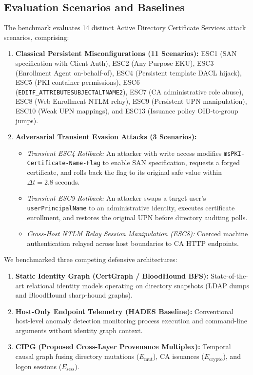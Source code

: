 \subsection{Evaluation Scenarios and Baselines}
The benchmark evaluates 14 distinct Active Directory Certificate Services attack scenarios, comprising:
\begin{enumerate}
    \item \textbf{Classical Persistent Misconfigurations (11 Scenarios):} ESC1 (SAN specification with Client Auth), ESC2 (Any Purpose EKU), ESC3 (Enrollment Agent on-behalf-of), ESC4 (Persistent template DACL hijack), ESC5 (PKI container permissions), ESC6 (\texttt{EDITF\_ATTRIBUTESUBJECTALTNAME2}), ESC7 (CA administrative role abuse), ESC8 (Web Enrollment NTLM relay), ESC9 (Persistent UPN manipulation), ESC10 (Weak UPN mappings), and ESC13 (Issuance policy OID-to-group jumps).
    \item \textbf{Adversarial Transient Evasion Attacks (3 Scenarios):}
    \begin{itemize}
        \item \textit{Transient ESC4 Rollback:} An attacker with write access modifies \texttt{msPKI-Certificate-Name-Flag} to enable SAN specification, requests a forged certificate, and rolls back the flag to its original safe value within $\Delta t = 2.8$ seconds.
        \item \textit{Transient ESC9 Rollback:} An attacker swaps a target user's \texttt{userPrincipalName} to an administrative identity, executes certificate enrollment, and restores the original UPN before directory auditing polls.
        \item \textit{Cross-Host NTLM Relay Session Manipulation (ESC8):} Coerced machine authentication relayed across host boundaries to CA HTTP endpoints.
    \end{itemize}
\end{enumerate}

We benchmarked three competing defensive architectures:
\begin{enumerate}
    \item \textbf{Static Identity Graph (CertGraph / BloodHound BFS):} State-of-the-art relational identity models operating on directory snapshots (LDAP dumps and BloodHound sharp-hound graphs).
    \item \textbf{Host-Only Endpoint Telemetry (HADES Baseline):} Conventional host-level anomaly detection monitoring process execution and command-line arguments without identity graph context.
    \item \textbf{CIPG (Proposed Cross-Layer Provenance Multiplex):} Temporal causal graph fusing directory mutations ($E_{\text{mut}}$), CA issuances ($E_{\text{crypto}}$), and logon sessions ($E_{\text{sess}}$).
\end{enumerate}

